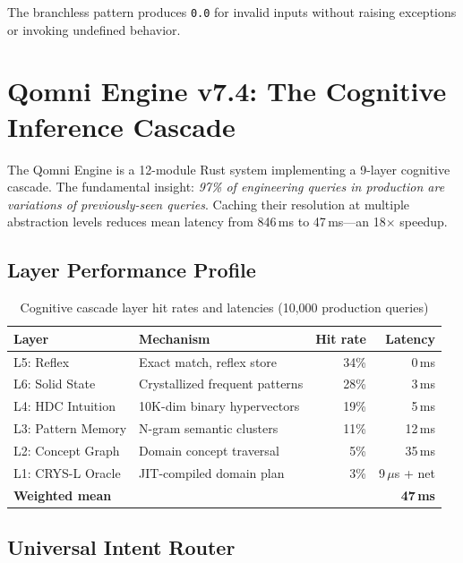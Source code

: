 \documentclass[11pt]{article}
\begin{document}
The branchless pattern produces \texttt{0.0} for invalid inputs without raising
exceptions or invoking undefined behavior.

\section{Qomni Engine v7.4: The Cognitive Inference Cascade}

The Qomni Engine is a 12-module Rust system implementing a 9-layer cognitive cascade.
The fundamental insight: \emph{97\% of engineering queries in production are variations
of previously-seen queries}. Caching their resolution at multiple abstraction levels
reduces mean latency from 846\,ms to 47\,ms---an 18$\times$ speedup.

\subsection{Layer Performance Profile}

\begin{table}[h]
\centering
\caption{Cognitive cascade layer hit rates and latencies (10,000 production queries)}
\label{tab:cascade}
\begin{tabular}{llrr}
\toprule
\textbf{Layer} & \textbf{Mechanism} & \textbf{Hit rate} & \textbf{Latency} \\
\midrule
L5: Reflex          & Exact match, reflex store      & 34\% & 0\,ms \\
L6: Solid State     & Crystallized frequent patterns & 28\% & 3\,ms \\
L4: HDC Intuition   & 10K-dim binary hypervectors    & 19\% & 5\,ms \\
L3: Pattern Memory  & N-gram semantic clusters       & 11\% & 12\,ms \\
L2: Concept Graph   & Domain concept traversal       & 5\%  & 35\,ms \\
L1: CRYS-L Oracle   & JIT-compiled domain plan       & 3\%  & 9\,$\mu$s + net \\
\midrule
\textbf{Weighted mean} & & & \textbf{47\,ms} \\
\bottomrule
\end{tabular}
\end{table}

\subsection{Universal Intent Router}
\end{document}
